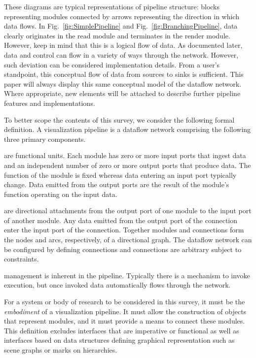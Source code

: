 \documentclass[journal,twocolumn,10pt,letterpaper,twoside]{IEEEtran}
\newcommand*{\figref}[1]{Fig.~\ref{#1}}
\begin{document}
These diagrams are typical representations of pipeline structure: blocks
representing modules connected by arrows representing the direction in
which data flows.  In \figref{fig:SimplePipeline} and
\figref{fig:BranchingPipeline}, data clearly originates in the read module
and terminates in the render module.  However, keep in mind that this is a
logical flow of data.  As documented later, data and control can flow in a
variety of ways through the network.  However, such deviation can be
considered implementation details.  From a user's standpoint, this
conceptual flow of data from sources to sinks is sufficient.  This paper
will always display this same conceptual model of the dataflow network.
Where appropriate, new elements will be attached to describe further
pipeline features and implementations.

To better scope the contents of this survey, we consider the following
formal definition.  A visualization pipeline is a dataflow network
comprising the following three primary components.

\begin{description}
\item[Modules] are functional units.  Each module has zero or more input
  ports that ingest data and an independent number of zero or more output
  ports that produce data.  The function of the module is fixed whereas
  data entering an input port typically change.  Data emitted from the
  output ports are the result of the module's function operating on the
  input data.
\item[Connections] are directional attachments from the output port of one
  module to the input port of another module.  Any data emitted from the
  output port of the connection enter the input port of the connection.
  Together modules and connections form the nodes and arcs, respectively,
  of a directional graph.  The dataflow network can be configured by
  defining connections and connections are arbitrary subject to
  constraints.
\item[Execution] management is inherent in the pipeline.  Typically there
  is a mechanism to invoke execution, but once invoked data automatically
  flows through the network.
\end{description}

For a system or body of research to be considered in this survey, it must
be the \emph{embodiment} of a visualization pipeline.  It must allow the
construction of objects that represent modules, and it must provide a means
to connect these modules.  This definition excludes interfaces that are
imperative or functional as well as interfaces based on data structures
defining graphical representation such as scene graphs or marks on
hierarchies.
\end{document}
